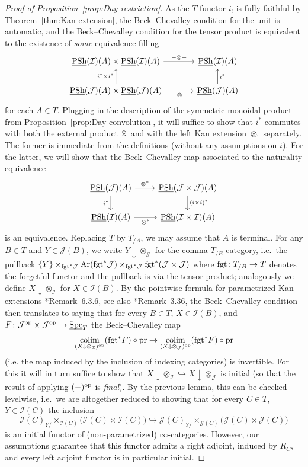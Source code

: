\documentclass[reqno]{memo-l}
\theoremstyle{mythm}
\theoremstyle{definition}
\numberwithin{equation}{section}
\newcommand{\Ii}{{\mathcal{I}}}
\newcommand{\Jj}{{\mathcal J}}
\newcommand{\exttimes}{\mathbin{\widehat{\smash{\times}}}}
\DeclareMathOperator{\Spc}{Spc}
\DeclareMathOperator{\PSh}{PSh}
\DeclareMathOperator{\Ar}{Ar}
\newcommand{\op}{{\textup{op}}}
\newcommand{\colim}{\mathop{\textup{colim}}}
\newcommand{\pr}{\textup{pr}}
\newcommand{\fgt}{\textup{fgt}}
\newcommand{\ulhelper}[2]{\underline{\setbox0=\hbox{$#1#2$}\dp0=0.4pt \box0\relax}}
\newcommand{\ul}[1]{{\mathpalette\ulhelper{#1}}\hbox{\rule[-2pt]{0pt}{0pt}}}
\begin{document}
\begin{proof}[Proof of Proposition~\ref{prop:Day-restriction}]
    As the $T$-functor $i_!$ is fully faithful by Theorem~\ref{thm:Kan-extension}, the Beck--Chevalley condition for the unit is automatic, and the Beck--Chevalley condition for the tensor product is equivalent to the existence of \emph{some} equivalence filling
    \[
        \begin{tikzcd}
            \ul\PSh(\Ii)(A)\times\ul\PSh(\Ii)(A)\arrow[r,"{-}\otimes{-}"] &[1em] \ul\PSh(\Ii)(A)\\
            \ul\PSh(\Jj)(A)\times\ul\PSh(\Jj)(A)\arrow[r,"{-}\otimes{-}"']\arrow[u,"i^*\times i^*"] & \ul\PSh(\Jj)(A)\arrow[u,"i^*"']
        \end{tikzcd}
    \]
    for each $A\in T$. Plugging in the description of the symmetric monoidal product from Proposition~\ref{prop:Day-convolution}, it will suffice to show that $i^*$ commutes with both the external product $\exttimes$ and with the left Kan extension $\otimes_!$ separately. The former is immediate from the definitions (without any assumptions on $i$). For the latter, we will show that the Beck--Chevalley map associated to the naturality equivalence
    \[
        \begin{tikzcd}
            \ul\PSh(\Jj)(A)\arrow[d,"i^*"']\arrow[r, "\otimes^*"] &\ul\PSh(\Jj\times\Jj)(A)\arrow[d,"(i\times i)^*"]\\
            \ul\PSh(\Ii)(A)\arrow[r,"\otimes^*"'] & \ul\PSh(\Ii\times\Ii)(A)
        \end{tikzcd}
    \]
    is an equivalence. Replacing $T$ by $T_{/A}$, we may assume that $A$ is terminal. For any $B\in T$ and $Y\in\Jj(B)$, we write $Y\downarrow{\otimes_\Jj}$ for the comma $T_{/B}$-category, i.e.~the pullback
    $\{Y\}\times_{\fgt^*\Jj}\Ar(\fgt^*\Jj)\times_{\fgt^*\Jj}\fgt^*(\Jj\times\Jj)$ where $\fgt\colon T_{/B}\to T$ denotes the forgetful functor and the pullback is via the tensor product; analogously we define $X\downarrow{\otimes_\Ii}$ for $X\in\Ii(B)$. By the pointwise formula for parametrized Kan extensions \cite{martiniwolf2021limits}*{Remark~6.3.6}, see also \cite{LLP}*{Remark~3.36}, the Beck--Chevalley condition then translates to saying that for every $B\in T$, $X\in\Ii(B)$, and $F\colon\Jj^\op\times\Jj^\op\to\ul\Spc_T$ the Beck--Chevalley map
    \[
        \colim_{(X\downarrow\otimes_\Ii)^\op} (\fgt^*F)\circ\pr
        \to
        \colim_{(X\downarrow\otimes_\Jj)^\op} (\fgt^*F)\circ\pr
    \]
    (i.e. the map induced by the inclusion of indexing categories) is invertible. For this it will in turn suffice to show that $X\downarrow\otimes_\Ii\hookrightarrow X\downarrow\otimes_\Jj$ is initial (so that the result of applying $(-)^\op$ is \emph{final}). By the previous lemma, this can be checked levelwise, i.e.\ we are altogether reduced to showing that for every $C\in T$, $Y\in\Ii(C)$ the inclusion
    \[
        \Ii(C)_{Y/}\times_{\Ii(C)}\big(\Ii(C)\times\Ii(C)\big)\hookrightarrow       
        \Jj(C)_{Y/}\times_{\Jj(C)}\big(\Jj(C)\times\Jj(C)\big)
    \]
    is an initial functor of (non-parametrized) $\infty$-categories. However, our assumptions guarantee that this functor admits a right adjoint, induced by $R_C$, and every left adjoint functor is in particular initial.
\end{proof}
\end{document}
